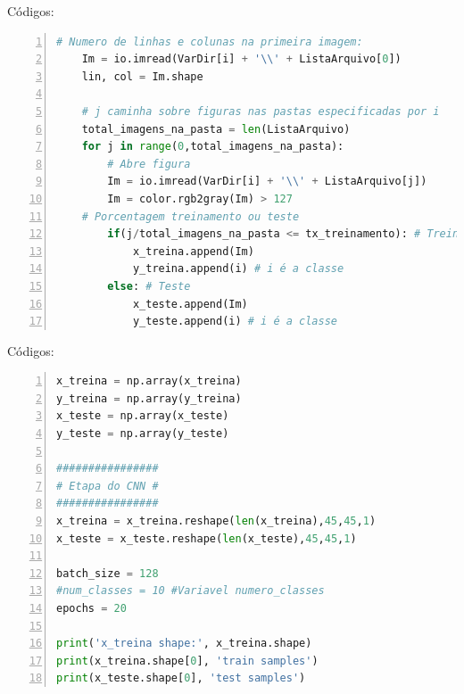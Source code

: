 \documentclass[hyperref={pdfpagelabels=false},table]{beamer}
\begin{document}
\begin{frame}[containsverbatim]
	\begin{exampleblock}{Códigos:}
		\begin{lstlisting}[language=python, showspaces=false, breaklines=true,
		keepspaces=true, numbers=left, numberfirstline=false]
	# Numero de linhas e colunas na primeira imagem:    
    Im = io.imread(VarDir[i] + '\\' + ListaArquivo[0])
    lin, col = Im.shape

    # j caminha sobre figuras nas pastas especificadas por i
    total_imagens_na_pasta = len(ListaArquivo)
    for j in range(0,total_imagens_na_pasta):
        # Abre figura
        Im = io.imread(VarDir[i] + '\\' + ListaArquivo[j])
        Im = color.rgb2gray(Im) > 127
	# Porcentagem treinamento ou teste
        if(j/total_imagens_na_pasta <= tx_treinamento): # Treinamento
            x_treina.append(Im)
            y_treina.append(i) # i é a classe
        else: # Teste
            x_teste.append(Im)
            y_teste.append(i) # i é a classe
		\end{lstlisting}
	\end{exampleblock}
\end{frame}

\begin{frame}[containsverbatim]
	\begin{exampleblock}{Códigos:}
		\begin{lstlisting}[language=python, showspaces=false, breaklines=true,
		keepspaces=true, numbers=left, numberfirstline=false]
x_treina = np.array(x_treina)
y_treina = np.array(y_treina)
x_teste = np.array(x_teste)
y_teste = np.array(y_teste)

################
# Etapa do CNN #
################
x_treina = x_treina.reshape(len(x_treina),45,45,1)
x_teste = x_teste.reshape(len(x_teste),45,45,1)

batch_size = 128
#num_classes = 10 #Variavel numero_classes
epochs = 20

print('x_treina shape:', x_treina.shape)
print(x_treina.shape[0], 'train samples')
print(x_teste.shape[0], 'test samples')
		\end{lstlisting}
	\end{exampleblock}
\end{frame}
\end{document}
